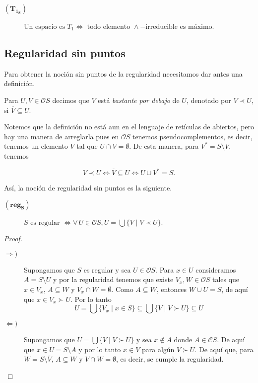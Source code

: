 \begin{description}
\item[$(\mathbf{T_{1_S}})$] $\mbox{Un espacio es } T_1 \Leftrightarrow \mbox{ todo elemento }\wedge-\mbox{irreducible es máximo}$.
\end{description}

\subsection{Regularidad sin puntos}

Para obtener la noción sin puntos de la regularidad necesitamos dar antes una definición.

\begin{dfn}\label{Bdebajo}
    Para $U, V\in \mathcal{O}S$ decimos que $V$ está \emph{bastante por debajo} de $U$, denotado por $V\prec U$, si $\overline{V}\subseteq U$.
\end{dfn}

Notemos que la definición no está aun en el lenguaje de retículas de abiertos, pero hay una manera de arreglarla pues en $\mathcal{O}S$ tenemos pseudocomplementos, es decir, tenemos un elemento $V$ tal que $U\cap V=\emptyset$. De esta manera, para $V^*=S\setminus \overline{V}$, tenemos

\[
V\prec U \Leftrightarrow \overline{V}\subseteq U\Leftrightarrow U\cup V^*=S.
\]

Así, la noción de regularidad sin puntos es la siguiente.

\begin{description}
\item[$(\mathbf{reg_S})$] $S \mbox{ es regular }\Leftrightarrow \forall\, U\in \mathcal{O}S, U=\bigcup\{V\mid V\prec U\}$.
\end{description}

\begin{proof}
    \begin{description}
        \item[$\Rightarrow )$] Supongamos que $S$ es regular y sea $U\in \mathcal{O}S$. Para $x\in U$ consideramos $A=S\setminus U$ y por la regularidad tenemos que existe $V_x, W\in \mathcal{O}S $ tales que $x\in V_x$, $A\subseteq W$ y $V_x\cap W=\emptyset$. Como $A\subseteq W$, entonces $W\cup U=S$, de aquí que $x\in V_x\succ U$. Por lo tanto 
        \[
        U=\bigcup\{V_x\mid x\in S\}\subseteq \bigcup\{V\mid V\succ U\}\subseteq U
        \]
        \item[$\Leftarrow )$] Supongamos que $U=\bigcup\{V\mid V\succ U\}$ y sea $x\notin A$ donde $A\in \mathcal{C}S$. De aquí que $x\in U=S\setminus A$ y por lo tanto $x\in V$ para algún $V\succ U$. De aquí que, para $W=S\setminus \overline{V}$, $A\subseteq W$ y $V\cap W=\emptyset$, es decir, se cumple la regularidad. 
    \end{description}
\end{proof}

